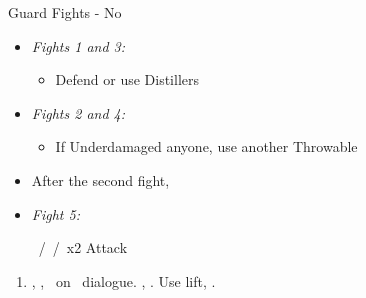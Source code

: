 \begin{battle}{Guard Fights - No \sleepingpowder}
	\begin{itemize}
		\item \textit{Fights 1 and 3:}
		      \begin{itemize}
			      \tidusf Attack
			      \item Defend or use Distillers
		      \end{itemize}
		\item \textit{Fights 2 and 4:}
		      \begin{itemize}
			      \switch{\tidus}{\kimahri}
			      \kimahrif \bombcore\ /\silencegrenade\ /\smokebomb\
			      \switch{\rikku}{\tidus}
			      \tidusf Attack
			      \kimahrif Repeat
			      \item If Underdamaged anyone, use another Throwable
		      \end{itemize}
		\item After the second fight, \formation{\tidus}{\rikku}{\lulu}
		\item \textit{Fight 5:}
		      \begin{itemize}
			      \switch{\tidus}{\rikku}
			      \rikkuf \bombcore\ /\silencegrenade\ /\smokebomb\ x2
			      \switch{\kimahri}{\tidus}
			      \tidusf Attack
		      \end{itemize}
	\end{itemize}
\end{battle}
\begin{enumerate}[resume]
	\item \sd, \skippablefmv[1:30], \sd\ on \yuna\ dialogue. \skippablefmv[30], \sd. Use lift, \sd.
\end{enumerate}
\bothvfill
\winvfill
\lossvfill
\ 
